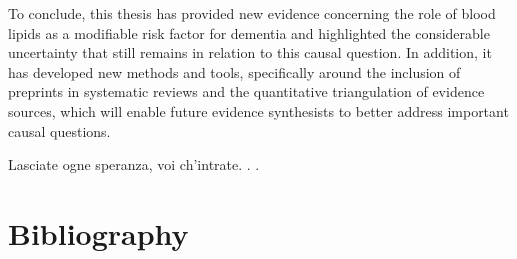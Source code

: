 \documentclass[a4paper, twoside]{templates/ociamthesis}
\begin{document}
To conclude, this thesis has provided new evidence concerning the role of blood lipids as a modifiable risk factor for dementia and highlighted the considerable uncertainty that still remains in relation to this causal question. In addition, it has developed new methods and tools, specifically around the inclusion of preprints in systematic reviews and the quantitative triangulation of evidence sources, which will enable future evidence synthesists to better address important causal questions.

\begin{savequote}
Lasciate ogne speranza, voi ch'intrate. . .
\end{savequote}

\hypertarget{bibliography}{%
\chapter{Bibliography}\label{bibliography}}
\end{document}
